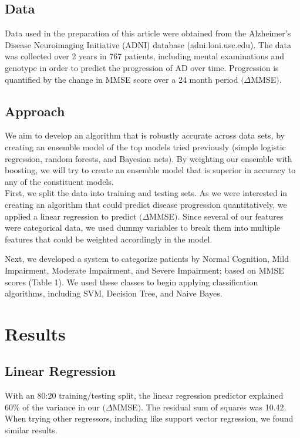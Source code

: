 \documentclass{article}
\begin{document}
\subsection{Data} Data used in the preparation of this article were obtained from the Alzheimer's Disease Neuroimaging Initiative (ADNI) database (adni.loni.usc.edu). The data was collected over 2 years in 767 patients, including mental examinations and genotype in order to predict the progression of AD over time. Progression is quantified by the change in MMSE score over a 24 month period $(\Delta$MMSE$)$.

\subsection{Approach} We aim to develop an algorithm that is robustly accurate across data sets, by creating an ensemble model of the top models tried previously (simple logistic regression, random forests, and Bayesian nets). By weighting our ensemble with boosting, we will try to create an ensemble model that is superior in accuracy to any of the constituent models.\\

First, we split the data into training and testing sets. As we were interested in creating an algorithm that could predict disease progression quantitatively, we applied a linear regression to predict $(\Delta$MMSE$)$. Since several of our features were categorical data, we used dummy variables to break them into multiple features that could be weighted accordingly in the model.

Next, we developed a system to categorize patients by Normal Cognition, Mild Impairment, Moderate Impairment, and Severe Impairment; based on MMSE scores (Table 1). We used these classes to begin applying classification algorithms, including SVM, Decision Tree, and Naive Bayes. 

\section{Results}


\subsection{Linear Regression}
With an 80:20 training/testing split, the linear regression predictor explained 60\% of the variance in our $(\Delta$MMSE$)$. The residual sum of squares was 10.42. When trying other regressors, including like support vector regression, we found similar results.
\end{document}
